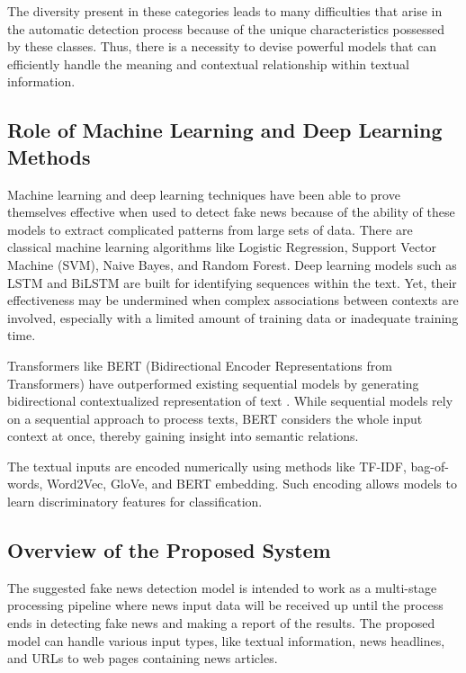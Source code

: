 \documentclass[runningheads]{llncs}
\begin{document}
The diversity present in these categories leads to many difficulties that arise in the automatic detection process because of the unique characteristics possessed by these classes. Thus, there is a necessity to devise powerful models that can efficiently handle the meaning and contextual relationship within textual information.

\subsection{Role of Machine Learning and Deep Learning Methods}

Machine learning and deep learning techniques have been able to prove themselves effective when used to detect fake news because of the ability of these models to extract complicated patterns from large sets of data. There are classical machine learning algorithms like Logistic Regression, Support Vector Machine (SVM), Naive Bayes, and Random Forest.
Deep learning models such as LSTM and BiLSTM are built for identifying sequences within the text. Yet, their effectiveness may be undermined when complex associations between contexts are involved, especially with a limited amount of training data or inadequate training time.

Transformers like BERT (Bidirectional Encoder Representations from Transformers) have outperformed existing sequential models by generating bidirectional contextualized representation of text \cite{Kaliyar2021FakeBERT, Mehta2022RecentTrends}. While sequential models rely on a sequential approach to process texts, BERT considers the whole input context at once, thereby gaining insight into semantic relations.

The textual inputs are encoded numerically using methods like TF-IDF, bag-of-words, Word2Vec, GloVe, and BERT embedding. Such encoding allows models to learn discriminatory features for classification.

\subsection{Overview of the Proposed System}

The suggested fake news detection model is intended to work as a multi-stage processing pipeline where news input data will be received up until the process ends in detecting fake news and making a report of the results. The proposed model can handle various input types, like textual information, news headlines, and URLs to web pages containing news articles.
\end{document}
